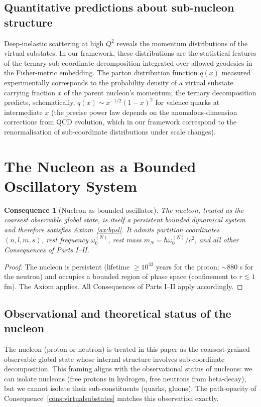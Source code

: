 \documentclass[11pt,twocolumn,a4paper]{article}
\theoremstyle{axiomstyle}
\theoremstyle{conseqstyle}
\newtheorem{consequence}{Consequence}
\theoremstyle{definition}
\theoremstyle{remark}
\begin{document}
\subsection{Quantitative predictions about sub-nucleon structure}

Deep-inelastic scattering at high $Q^{2}$ reveals the momentum distributions of the virtual substates. In our framework, these distributions are the statistical features of the ternary sub-coordinate decomposition integrated over allowed geodesics in the Fisher-metric embedding. The parton distribution function $q(x)$ measured experimentally corresponds to the probability density of a virtual substate carrying fraction $x$ of the parent nucleon's momentum; the ternary decomposition predicts, schematically, $q(x)\sim x^{-1/2}(1-x)^{2}$ for valence quarks at intermediate $x$ (the precise power law depends on the anomalous-dimension corrections from QCD evolution, which in our framework correspond to the renormalisation of sub-coordinate distributions under scale changes).

\section{The Nucleon as a Bounded Oscillatory System}
\label{sec:nucleonoscillator}

\begin{consequence}[Nucleon as bounded oscillator]
\label{cons:nucleonosc}
The nucleon, treated as the coarsest observable global state, is itself a persistent bounded dynamical system and therefore satisfies Axiom~\ref{ax:bpsl}. It admits partition coordinates $(n,l,m,s)$, rest frequency $\omega_{0}^{(N)}$, rest mass $m_{N}=\hbar\omega_{0}^{(N)}/c^{2}$, and all other Consequences of Parts I--II.
\end{consequence}

\begin{proof}
The nucleon is persistent (lifetime $\ge 10^{33}$ years for the proton; $\sim 880$ s for the neutron) and occupies a bounded region of phase space (confinement to $r\lesssim 1$ fm). The Axiom applies. All Consequences of Parts I--II apply accordingly.
\end{proof}

\subsection{Observational and theoretical status of the nucleon}

The nucleon (proton or neutron) is treated in this paper as the coarsest-grained observable global state whose internal structure involves sub-coordinate decomposition. This framing aligns with the observational status of nucleons: we can isolate nucleons (free protons in hydrogen, free neutrons from beta-decay), but we cannot isolate their sub-constituents (quarks, gluons). The path-opacity of Consequence~\ref{cons:virtualsubstates} matches this observation exactly.
\end{document}
